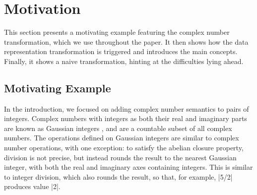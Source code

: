 \section{Motivation}
\label{sec:problem}

This section presents a motivating example featuring the complex number transformation, which we use throughout the paper. It then shows how the data representation transformation is triggered and introduces the main concepts. Finally, it shows a naive transformation, hinting at the difficulties lying ahead.

\subsection{Motivating Example}

In the introduction, we focused on adding complex number semantics to
pairs of integers. Complex numbers with integers as both their real
and imaginary parts are known as Gaussian integers
\cite{gauss1828theoria,gaussian-integers-wikipedia}, and are a
countable subset of all complex numbers. The operations defined on
Gaussian integers are similar to complex number operations, with one
exception: to satisfy the abelian closure property, division is not precise,
but instead rounds the result to the nearest Gaussian integer, with both the real and imaginary
axes containing integers. This is similar to integer division, which
also rounds the result, so that, for example, |5/2| produces value
|2|.


